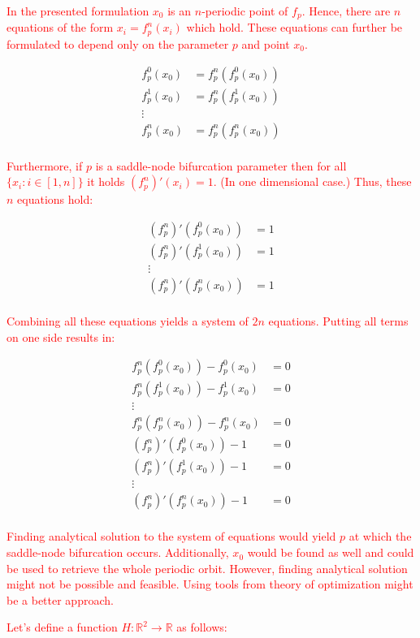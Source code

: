 \textcolor{red}{
In the presented formulation $x_0$ is an $n$-periodic point of $f_{p}$.
Hence, there are $n$ equations of the form $x_i = f_{p}^{n}(x_i)$ which hold.
These equations can further be formulated to depend only on the parameter $p$ and point $x_0$.
}

\begin{align*} 
f_{p}^{0}(x_0) &= f_{p}^{n}(f_{p}^{0}(x_0)) \\
f_{p}^{1}(x_0) &= f_{p}^{n}(f_{p}^{1}(x_0)) \\
\vdots \\
f_{p}^{n}(x_0) &= f_{p}^{n}(f_{p}^{n}(x_0)) \\
\end{align*}

\textcolor{red}{
Furthermore, if $p$ is a saddle-node bifurcation parameter then for all $\{ x_{i}: i \in [1, n] \}$ it holds $(f_{p}^{n})'(x_i) = 1$. (In one dimensional case.)
Thus, these $n$ equations hold:
}

\begin{align*} 
(f_{p}^{n})'(f_{p}^{0}(x_0)) &= 1 \\
(f_{p}^{n})'(f_{p}^{1}(x_0)) &= 1 \\
\vdots \\
(f_{p}^{n})'(f_{p}^{n}(x_0)) &= 1 \\
\end{align*}

\textcolor{red}{
Combining all these equations yields a system of $2n$ equations.
Putting all terms on one side results in:
}

\begin{align*} 
f_{p}^{n}(f_{p}^{0}(x_0)) - f_{p}^{0}(x_0) &= 0 \\
f_{p}^{n}(f_{p}^{1}(x_0)) - f_{p}^{1}(x_0) &= 0 \\
\vdots \\
f_{p}^{n}(f_{p}^{n}(x_0)) - f_{p}^{n}(x_0) &= 0 \\
(f_{p}^{n})'(f_{p}^{0}(x_0)) - 1 &= 0 \\
(f_{p}^{n})'(f_{p}^{1}(x_0)) - 1 &= 0 \\
\vdots \\
(f_{p}^{n})'(f_{p}^{n}(x_0)) - 1 &= 0 \\
\end{align*}

\textcolor{red}{
Finding analytical solution to the system of equations would yield $p$ at which the saddle-node bifurcation occurs.
Additionally, $x_0$ would be found as well and could be used to retrieve the whole periodic orbit.
However, finding analytical solution might not be possible and feasible.
Using tools from theory of optimization might be a better approach.
}
\par
\textcolor{red}{
Let's define a function $H: \mathbb{R}^{2} \rightarrow \mathbb{R}$ as follows:
}

